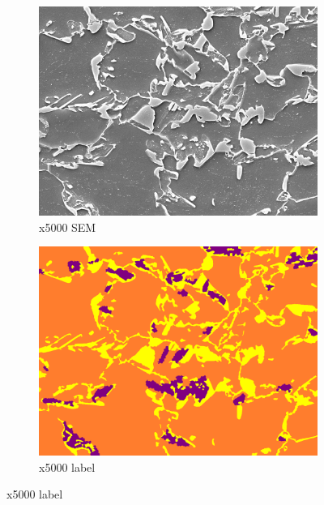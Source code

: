 \documentclass[]{article}
\begin{document}
\begin{figure}[ht]
\begin{subfigure}[b]{0.2\textwidth}
		\includegraphics[width=\textwidth]{images/x5000/1.png}
		\caption{x5000 SEM}
		\label{fig:image2.2.1}
	\end{subfigure}
	\begin{subfigure}[b]{0.2\textwidth}
		\centering
		\includegraphics[width=\textwidth]{images/x5000/1_label.png}
		\caption{x5000 label}
		\label{fig:image2.2.2}
	\end{subfigure}
	

\end{figure}
\end{document}
